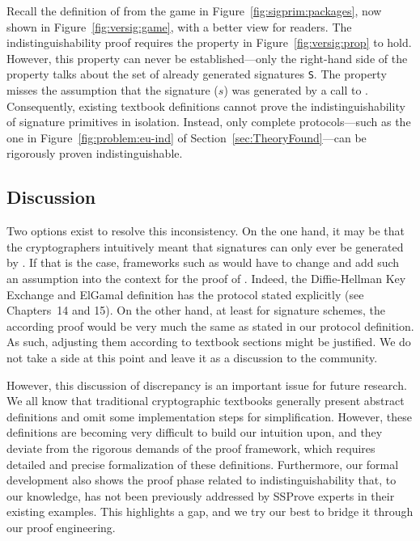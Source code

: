 %
Recall the definition of \eversig from the game in Figure~\ref{fig:sigprim:packages}, 
now shown in Figure~\ref{fig:versig:game}, with a better view for readers. 
%
The indistinguishability proof requires the property in Figure~\ref{fig:versig:prop} to hold.
%
However, this property can never be established—only 
the right-hand side of the property talks about
the set of already generated signatures \texttt{S}.
%
The property misses the assumption that
the signature ($s$) was generated by
a call to \esign.
%
Consequently, existing textbook definitions cannot prove the 
indistinguishability of signature primitives in isolation. 
%
Instead, only complete protocols—such as the one in Figure~\ref{fig:problem:eu-ind} 
of Section~\ref{sec:TheoryFound}—can be rigorously proven indistinguishable.

\subsection{Discussion}
%
Two options exist to resolve this inconsistency.
%
On the one hand, it may be that the cryptographers
intuitively meant that signatures can only ever be
generated by \esign.
%
If that is the case, frameworks such as \ssprove
would have to change and add such an assumption
into the context for the proof of \eversig.
%
Indeed, the Diffie-Hellman Key Exchange and ElGamal 
definition has the protocol stated explicitly
(see Chapters~14 and 15).
%
On the other hand, at least for signature schemes,
the according proof would be very much the same
as stated in our protocol definition.
%
As such, adjusting them according to textbook sections might be justified.
%
We do not take a side at this point and leave it
as a discussion to the community.
%

However, this discussion of discrepancy is an important issue for future research. 
%
We all know that traditional cryptographic textbooks generally present abstract definitions 
and omit some implementation steps for simplification. 
%
However, these definitions are becoming very difficult to build our 
intuition upon, and they deviate from the rigorous demands 
of the proof framework, which requires detailed and precise formalization of these definitions. 
%
Furthermore, our formal development also shows the proof phase related to indistinguishability that, 
to our knowledge, has not been previously addressed by SSProve experts in their existing examples. 
%
This highlights a gap, and we try our best to bridge it through our proof engineering. 
%

